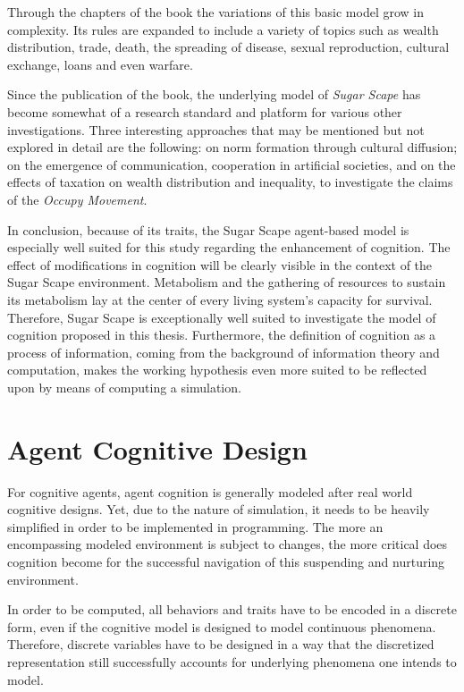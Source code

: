 Through the chapters of the book the variations of this basic model grow in complexity. Its rules are expanded to include a variety of topics such as wealth distribution, trade, death, the spreading of disease, sexual reproduction, cultural exchange, loans and even warfare.

Since the publication of the book, the underlying model of \textit{Sugar Scape} has become somewhat of a research standard and platform for various other investigations. Three interesting approaches that may be mentioned but not explored in detail are the following: \citet{Flentge2001} on norm formation through cultural diffusion; \citet{Buzing2005} on the emergence of communication, cooperation in artificial societies, and \citet{Downey2012} on the effects of taxation on wealth distribution and inequality, to investigate the claims of the \textit{Occupy Movement}.

In conclusion, because of its traits, the Sugar Scape agent-based model is especially well suited for this study regarding the enhancement of cognition. The effect of modifications in cognition will be clearly visible in the context of the Sugar Scape environment. Metabolism and the gathering of resources to sustain its metabolism lay at the center of every living system's capacity for survival. Therefore, Sugar Scape is exceptionally well suited to investigate the model of cognition proposed in this thesis. Furthermore, the definition of cognition as a process of information, coming from the background of information theory and computation, makes the working hypothesis even more suited to be reflected upon by means of computing a simulation.

\section{Agent Cognitive Design}
For cognitive agents, agent cognition is generally modeled after real world cognitive designs. Yet, due to the nature of simulation, it needs to be heavily simplified in order to be implemented in programming. The more an encompassing modeled environment is subject to changes, the more critical does cognition become for the successful navigation of this suspending and nurturing environment.

In order to be computed, all behaviors and traits have to be encoded in a discrete form, even if the cognitive model is designed to model continuous phenomena. Therefore, discrete variables have to be designed in a way that the discretized representation still successfully accounts for underlying phenomena one intends to model.

